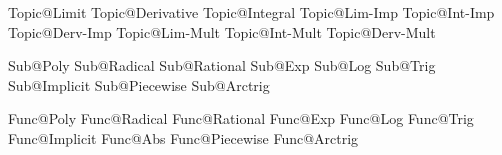 Topic@Limit	         		 %
Topic@Derivative            %
Topic@Integral 				 %
Topic@Lim-Imp				 %
Topic@Int-Imp				 %
Topic@Derv-Imp				 %
Topic@Lim-Mult				 %
Topic@Int-Mult				 %
Topic@Derv-Mult				 %




Sub@Poly					%
Sub@Radical					%
Sub@Rational				%
Sub@Exp						%
Sub@Log						%
Sub@Trig					%
Sub@Implicit				%
Sub@Piecewise				%
Sub@Arctrig					%

Func@Poly					%
Func@Radical				%
Func@Rational				%
Func@Exp					%
Func@Log					%
Func@Trig					%
Func@Implicit				%
Func@Abs                    %
Func@Piecewise				%
Func@Arctrig                %



